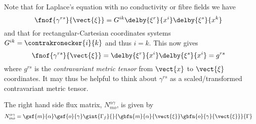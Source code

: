 Note that for Laplace's equation with no conductivity or fibre fields we have
\begin{equation}
  \fnof{\gamma^{rs}}{\vect{\xi}}=G^{ik}\delby{\xi^{r}}{x^{i}}\delby{\xi^{s}}{x^{k}}
  \label{eqn:diffusiongammadefinition2}
\end{equation}
and that for rectangular-Cartesian coordinates systems
$G^{ik}=\contrakronecker{i}{k}$ and thus $i=k$. This now gives
\begin{equation}
  \fnof{\gamma^{rs}}{\vect{\xi}}=\delby{\xi^{r}}{x^{i}}\delby{\xi^{s}}{x^{i}}=g^{rs}
  \label{eqn:diffusiongammadefinition3}
\end{equation}
where $g^{rs}$ is the \emph{contravariant metric tensor} from $\vect{x}$ to
$\vect{\xi}$ coordinates. It may thus be helpful to think about $\gamma^{rs}$
as a scaled/transformed contravariant metric tensor.

The right hand side flux matrix, $N^{\alpha\gamma}_{mo}$, is given by
\begin{equation}
  N^{\alpha\gamma}_{mo} = \gsf{m}{\alpha}\gsf{o}{\gamma}
  \gint{\Gamma_{f}}{}{\gbfn{m}{\alpha}{\vect{\xi}}\gbfn{o}{\gamma}{\vect{\xi}}}{\Gamma}
\end{equation}




